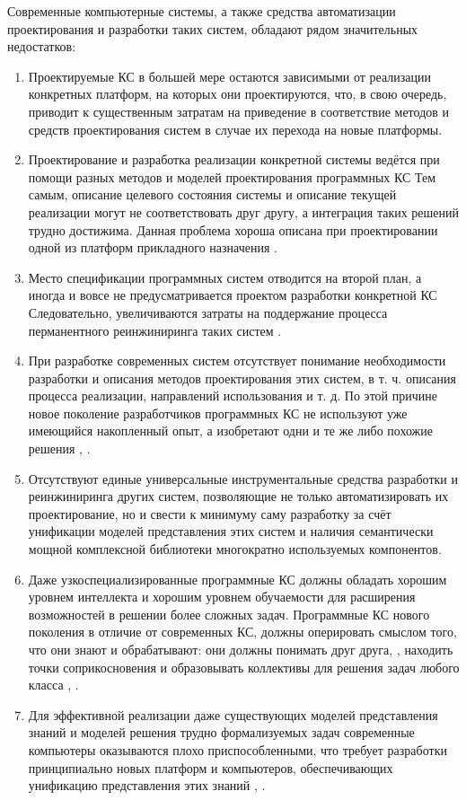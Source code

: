 Современные компьютерные системы, а также средства автоматизации проектирования и разработки таких систем, обладают рядом значительных недостатков:
\begin{enumerate}
   \item Проектируемые КС в большей мере остаются зависимыми от реализации конкретных платформ, на которых они проектируются, что, в свою очередь, приводит к существенным затратам на приведение в соответствие методов и средств проектирования систем в случае их перехода на новые платформы.
   \item Проектирование и разработка реализации конкретной системы ведётся при помощи разных методов и моделей проектирования программных КС Тем самым, описание целевого состояния системы и описание текущей реализации могут не соответствовать друг другу, а интеграция таких решений трудно достижима. Данная проблема хороша описана при проектировании одной из платформ прикладного назначения \cite{Sokolov2021-3}.
   \item Место спецификации программных систем отводится на второй план, а иногда и вовсе не предусматривается проектом разработки конкретной КС Следовательно, увеличиваются затраты на поддержание процесса перманентного реинжиниринга таких систем \cite{dillon2008ontology}.
   \item При разработке современных систем отсутствует понимание необходимости разработки и описания методов проектирования этих систем, в т. ч. описания процесса реализации, направлений использования и т. д. По этой причине новое поколение разработчиков программных КС не используют уже имеющийся накопленный опыт, а изобретают одни и те же либо похожие решения \cite{Dillon2007}, \cite{dillon2008ontology}.
   \item Отсутствуют единые универсальные инструментальные средства разработки \cite{kabilan2007ontology} и реинжиниринга других систем, позволяющие не только автоматизировать их проектирование, но и свести к минимуму саму разработку за счёт унификации моделей представления этих систем и наличия семантически мощной комплексной библиотеки многократно используемых компонентов.
   \item Даже узкоспециализированные программные КС должны обладать хорошим уровнем интеллекта и хорошим уровнем обучаемости для расширения возможностей в решении более сложных задач. Программные КС нового поколения в отличие от современных КС, должны оперировать смыслом того, что они знают и обрабатывают: они должны понимать друг друга, \cite{ouksel1999semantic}, \cite{neiva2016towards} находить точки соприкосновения и образовывать коллективы для решения задач любого класса \cite{lu2022rethinking}, \cite{zhou2022cognitive}.
   \item Для эффективной реализации даже существующих моделей представления знаний и моделей решения трудно формализуемых задач современные компьютеры оказываются плохо приспособленными, что требует разработки принципиально новых платформ и компьютеров, обеспечивающих унификацию представления этих знаний \cite{hagoort2009semantic}, \cite{siekmann1984universal}.
\end{enumerate}

